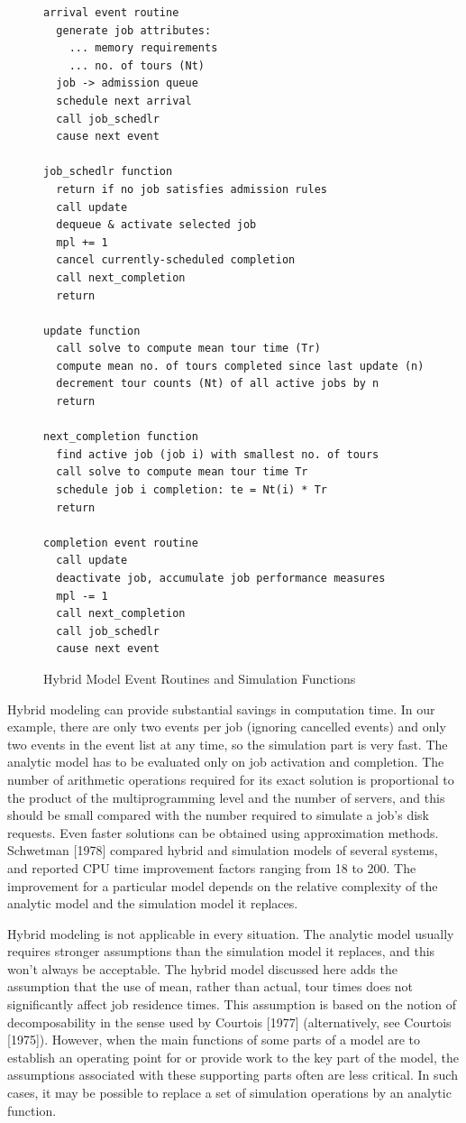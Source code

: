 \begin{figure}[ht]
\centering
\begingroup\small
\begin{verbatim}
arrival event routine
  generate job attributes:
    ... memory requirements
    ... no. of tours (Nt)
  job -> admission queue
  schedule next arrival
  call job_schedlr
  cause next event

job_schedlr function
  return if no job satisfies admission rules
  call update
  dequeue & activate selected job
  mpl += 1
  cancel currently-scheduled completion
  call next_completion
  return

update function
  call solve to compute mean tour time (Tr)
  compute mean no. of tours completed since last update (n)
  decrement tour counts (Nt) of all active jobs by n
  return

next_completion function
  find active job (job i) with smallest no. of tours
  call solve to compute mean tour time Tr
  schedule job i completion: te = Nt(i) * Tr
  return

completion event routine
  call update
  deactivate job, accumulate job performance measures
  mpl -= 1
  call next_completion
  call job_schedlr
  cause next event
\end{verbatim}
\endgroup
\caption{Hybrid Model Event Routines and Simulation Functions}
\end{figure}

Hybrid modeling can provide substantial savings in computation time. In our
example, there are only two events per job (ignoring cancelled events) and
only two events in the event list at any time, so the simulation part is very
fast. The analytic model has to be evaluated only on job activation and
completion. The number of arithmetic operations required for its exact
solution is proportional to the product of the multiprogramming level and the
number of servers, and this should be small compared with the number required
 to simulate a job's disk requests. Even faster solutions can be obtained using
approximation methods. Schwetman [1978] compared hybrid and simulation models
of several systems, and reported CPU time improvement factors ranging from 18
 to 200. The improvement for a particular model depends on the relative
complexity of the analytic model and the simulation model it replaces.

Hybrid modeling is not applicable in every situation. The analytic model
usually requires stronger assumptions than the simulation model it replaces,
and this won't always be acceptable. The hybrid model discussed here adds the
assumption that the use of mean, rather than actual, tour times does not
significantly affect job residence times. This assumption is based on the
notion of decomposability in the sense used by Courtois [1977] (alternatively,
see Courtois [1975]). However, when the main functions of some parts of a
model are to establish an operating point for or provide work to the key part
of the model, the assumptions associated with these supporting parts often are
less critical. In such cases, it may be possible to replace a set of
simulation operations by an analytic function.

